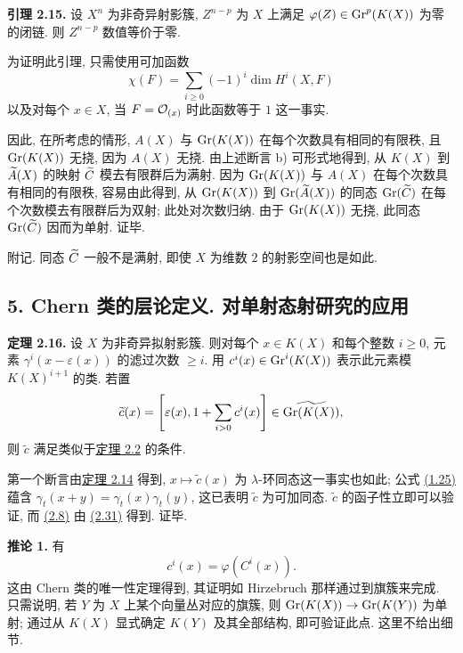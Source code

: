 \textbf{引理 2.15.} 设 $X^n$ 为非奇异射影簇, $Z^{n-p}$ 为 $X$ 上满足 $\varphi(Z)\in\operatorname{Gr}^p(K(X))$ 为零的闭链. 则 $Z^{n-p}$ 数值等价于零.

为证明此引理, 只需使用可加函数
\[
 \chi(F)=\sum_{i\geq 0}(-1)^i\dim H^i(X,F)
\]
以及对每个 $x\in X$, 当 $F=\mathcal O_{(x)}$ 时此函数等于 $1$ 这一事实.

因此, 在所考虑的情形, $A(X)$ 与 $\operatorname{Gr}(K(X))$ 在每个次数具有相同的有限秩, 且 $\operatorname{Gr}(K(X))$ 无挠, 因为 $A(X)$ 无挠. 由上述断言 b) 可形式地得到, 从 $K(X)$ 到 $\widetilde A(X)$ 的映射 $\widetilde C$ 模去有限群后为满射. 因为 $\operatorname{Gr}(K(X))$ 与 $A(X)$ 在每个次数具有相同的有限秩, 容易由此得到, 从 $\operatorname{Gr}(K(X))$ 到 $\operatorname{Gr}(\widetilde A(X))$ 的同态 $\operatorname{Gr}(\widetilde C)$ 在每个次数模去有限群后为双射; 此处对次数归纳. 由于 $\operatorname{Gr}(K(X))$ 无挠, 此同态 $\operatorname{Gr}(\widetilde C)$ 因而为单射. 证毕.

附记. 同态 $\widetilde C$ 一般不是满射, 即使 $X$ 为维数 $2$ 的射影空间也是如此.

\subsection*{5. Chern 类的层论定义. 对单射态射研究的应用}

\textbf{定理 2.16.} 设 $X$ 为非奇异拟射影簇. 则对每个 $x\in K(X)$ 和每个整数 $i\geq 0$, 元素 $\gamma^i(x-\varepsilon(x))$ 的滤过次数 $\geq i$. 用 $c^i(x)\in\operatorname{Gr}^i(K(X))$ 表示此元素模 $K(X)^{i+1}$ 的类. 若置
\[
 \widetilde c(x)=\left[\varepsilon(x),1+\sum_{i>0}c^i(x)\right]\in \widetilde{\operatorname{Gr}(K(X))},
\]
则 $\widetilde c$ 满足类似于\hyperlink{sga6.e00.thm.2-2}{定理 2.2} 的条件.

第一个断言由\hyperlink{sga6.e00.thm.2-14}{定理 2.14} 得到, $x\mapsto\widetilde c(x)$ 为 $\lambda$-环同态这一事实也如此; 公式 \hyperlink{sga6.e00.eq.1-25}{(1.25)} 蕴含 $\gamma_t(x+y)=\gamma_t(x)\gamma_t(y)$, 这已表明 $\widetilde c$ 为可加同态. $\widetilde c$ 的函子性立即可以验证, 而 \hyperlink{sga6.e00.eq.2-8}{(2.8)} 由 \hyperlink{sga6.e00.eq.2-31}{(2.31)} 得到. 证毕.

\textbf{推论 1.} 有
\[
 c^i(x)=\varphi(C^i(x)).
\]
这由 Chern 类的唯一性定理得到, 其证明如 Hirzebruch 那样通过到旗簇来完成. 只需说明, 若 $Y$ 为 $X$ 上某个向量丛对应的旗簇, 则 $\operatorname{Gr}(K(X))\to\operatorname{Gr}(K(Y))$ 为单射; 通过从 $K(X)$ 显式确定 $K(Y)$ 及其全部结构, 即可验证此点. 这里不给出细节.


